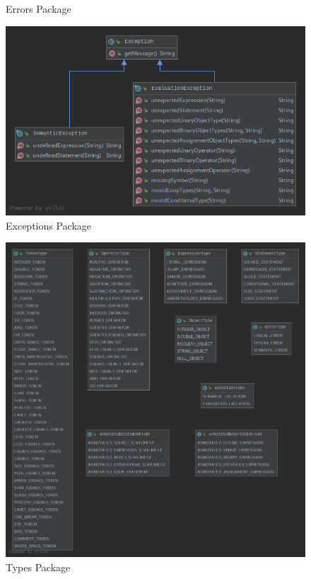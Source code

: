 \documentclass[
]{report}
\begin{document}
\begin{appendices}
\begin{figure}
		\caption{Errors Package}
		\label{fig:errors-package-diagram}
	\end{figure}
	\begin{figure}
		\centering
		\includegraphics[width=\textwidth]{exceptions-package-diagram}
		\caption{Exceptions Package}
		\label{fig:exceptions-package-diagram}
	\end{figure}
	\begin{figure}
		\centering
		\includegraphics[width=\textwidth]{types-package-diagram}
		\caption{Types Package}
		\label{fig:types-package-diagram}

\end{figure}
\end{appendices}
\end{document}
